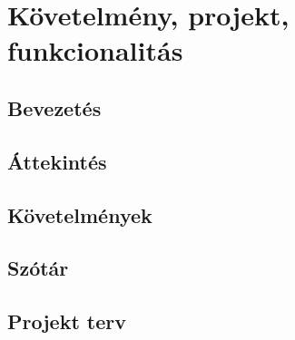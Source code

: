 %
\chapter{Követelmény, projekt, funkcionalitás}

\thispagestyle{fancy}

\section{Bevezetés}









\section{Áttekintés}


\section{Követelmények}




\section{Szótár}


\section{Projekt terv}



